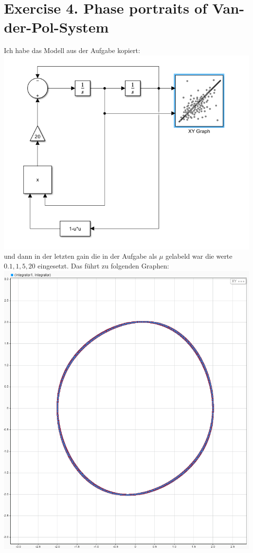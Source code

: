 \documentclass{scrartcl}
\begin{document}
\section*{Exercise 4. Phase portraits of Van-der-Pol-System}
Ich habe das Modell aus der Aufgabe kopiert:\\
\includegraphics[scale=0.3]{E4.png}\\
und dann in der letzten gain die in der Aufgabe als $\mu$ gelabeld war die werte $0.1, 1, 5, 20$ eingesetzt. Das führt zu folgenden Graphen:\\
\includegraphics[scale=0.3]{E4mu01.png}
\end{document}

